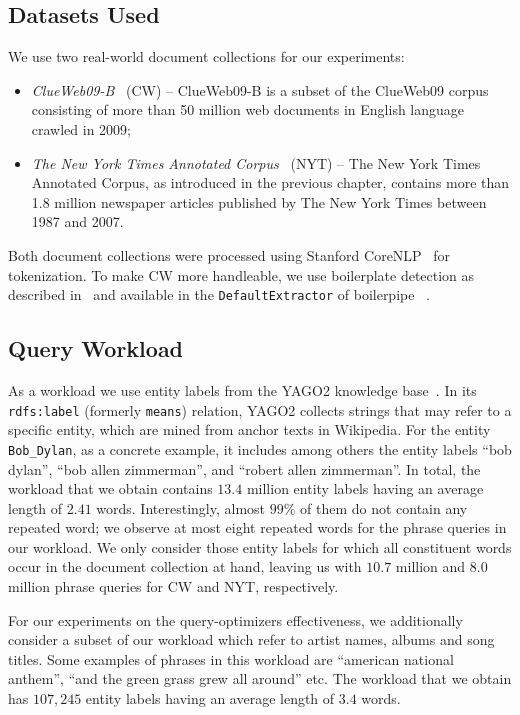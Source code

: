 \subsection{Datasets Used} We use two real-world document
collections for our experiments:
\begin{itemize}

\item \emph{ClueWeb09-B}~\cite{cw} (\textsc{CW}) -- ClueWeb09-B is a subset of the ClueWeb09 corpus consisting of more than 50
  million web documents in English language crawled in 2009; 

\item \emph{The New York Times Annotated Corpus}~\cite{NYT}
  (\textsc{NYT}) -- The New York Times Annotated Corpus, as introduced in the previous chapter, contains more than 1.8 million newspaper articles published
  by The New York Times between 1987 and 2007.

\end{itemize}
Both document collections were processed using Stanford
CoreNLP~\cite{corenlp} for tokenization. To make CW more handleable,
we use boilerplate detection as described
in~\cite{Kohlschutter:2010fk} and available in the
\texttt{DefaultExtractor} of boilerpipe~\cite{boilerpipe} .

\subsection{Query Workload} As a workload we use entity labels from the YAGO2
knowledge base~\cite{Hoffart:2013fk}. In its \texttt{rdfs:label}
(formerly \texttt{means}) relation, YAGO2 collects strings that may
refer to a specific entity, which are mined from anchor texts in
Wikipedia. For the entity \texttt{Bob\_Dylan}, as a concrete example,
it includes among others the entity labels \textsf{``bob dylan''},
\textsf{``bob allen zimmerman''}, and \textsf{``robert allen
  zimmerman''}. In total, the workload that we obtain contains $13.4$
million entity labels having an average length of $2.41$
words. Interestingly, almost $99\%$ of them do not contain any
repeated word; we observe at most eight repeated words for the phrase
queries in our workload. We only consider those entity labels for
which all constituent words occur in the document collection at hand,
leaving us with $10.7$ million and $8.0$ million phrase queries for CW
and NYT, respectively. 

For our experiments on the query-optimizers effectiveness, we additionally consider a subset of our workload which refer to artist names, albums and song titles. Some examples of phrases in this workload are \textsf{``american national anthem''}, \textsf{``and the green grass grew all around''} etc. The workload that we obtain has $107,245$ entity labels having an average length of $3.4$ words. 


